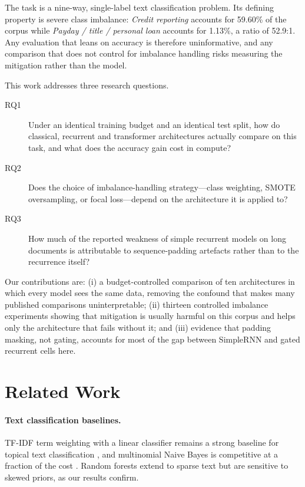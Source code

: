 \documentclass[11pt]{article}
\begin{document}
The task is a nine-way, single-label text classification problem. Its defining
property is severe class imbalance: \textit{Credit reporting} accounts for
59.60\% of the corpus while \textit{Payday / title / personal loan} accounts for
1.13\%, a ratio of 52.9:1. Any evaluation that leans on accuracy is therefore
uninformative, and any comparison that does not control for imbalance handling
risks measuring the mitigation rather than the model.

This work addresses three research questions.

\begin{description}
  \item[RQ1] Under an identical training budget and an identical test split,
  how do classical, recurrent and transformer architectures actually compare on
  this task, and what does the accuracy gain cost in compute?
  \item[RQ2] Does the choice of imbalance-handling strategy---class weighting,
  SMOTE oversampling, or focal loss---depend on the architecture it is applied
  to?
  \item[RQ3] How much of the reported weakness of simple recurrent models on
  long documents is attributable to sequence-padding artefacts rather than to
  the recurrence itself?
\end{description}

Our contributions are: (i) a budget-controlled comparison of ten architectures
in which every model sees the same data, removing the confound that makes many
published comparisons uninterpretable; (ii) thirteen controlled imbalance
experiments showing that mitigation is usually harmful on this corpus and helps
only the architecture that fails without it; and (iii) evidence that padding
masking, not gating, accounts for most of the gap between SimpleRNN and gated
recurrent cells here.

\section{Related Work}
\label{sec:related}

\paragraph{Text classification baselines.}
TF-IDF term weighting \cite{jones1972statistical} with a linear classifier
remains a strong baseline for topical text classification
\cite{joachims1998text}, and multinomial Naive Bayes is competitive at a
fraction of the cost \cite{mccallum1998comparison}. Random forests
\cite{breiman2001random} extend to sparse text but are sensitive to skewed
priors, as our results confirm.
\end{document}
